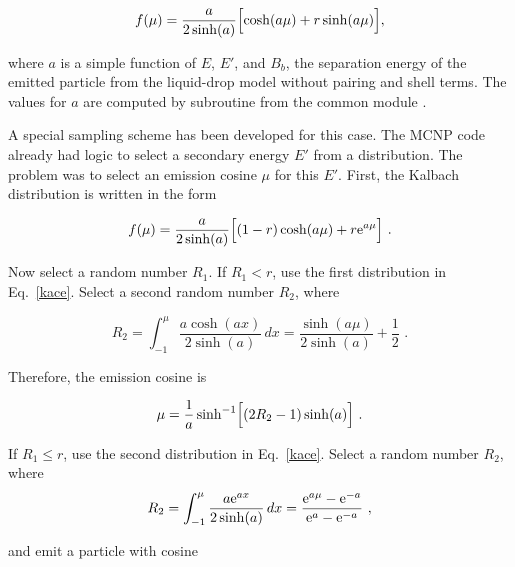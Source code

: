 \begin{equation}
   f(\mu)=\frac{a}{2\sinh(a)}\Bigl[\cosh(a\mu)+r\sinh(a\mu)\Bigr],
\end{equation}
\vspace{0.5 pt}

\noindent
where $a$ is a simple function of $E$, $E'$, and $B_b$, the separation
energy of the emitted particle from the liquid-drop model without
pairing and shell terms.  The values for $a$ are computed by
subroutine  from the common module .

A special sampling scheme has been developed for this case.  The MCNP
code already had logic to select a secondary energy $E'$ from a
distribution.  The problem was to select an emission cosine $\mu$
for this $E'$.  First, the Kalbach distribution is written in the form

\begin{equation}
   f(\mu)=\frac{a}{2\sinh(a)}\Bigl[ (1-r)\cosh(a\mu)
      +r{\rm e}^{a\mu} \Bigr]\,\,.
\label{kace}
\end{equation}
\vspace{0.5 pt}

\noindent
Now select a random number $R_1$.  If $R_1<r$, use the first
distribution in Eq.~\ref{kace}.  Select a second random number
$R_2$, where

\begin{equation}
   R_2=\int_{-1}^\mu \frac{a\cosh(ax)}{2\sinh(a)}\,dx
      =\frac{\sinh(a\mu)}{2\sinh(a)}+\frac{1}{2}\,\,.
\end{equation}
\vspace{0.5 pt}

\noindent
Therefore, the emission cosine is

\begin{equation}
   \mu=\frac{1}{a}\sinh^{-1}\Bigl[ (2R_2-1)\sinh(a) \Bigr]\,\,.
\end{equation}
\vspace{0.5 pt}

\noindent
If $R_1\le r$, use the second distribution in Eq.~\ref{kace}.  Select
a random number $R_2$, where
\begin{equation}
   R_2=\int_{-1}^\mu \frac{a{\rm e}^{ax}}{2\sinh(a)}\,dx
      =\frac{{\rm e}^{a\mu}-{\rm e}^{-a}}{{\rm e}^a-{\rm e}^{-a}}\,\,,
\end{equation}
\vspace{0.5 pt}

\noindent
and emit a particle with cosine

